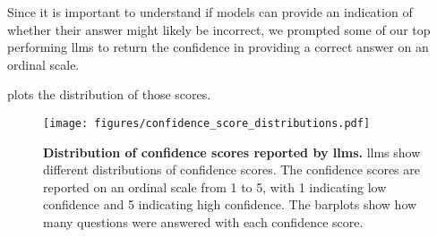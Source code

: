 Since it is important to understand if models can provide an indication of whether their answer might likely be incorrect, we prompted some of our top performing \glspl{llm} to return the confidence in providing a correct answer on an ordinal scale. 

 plots the distribution of those scores.

\begin{figure} 
    \centering
    \texttt{[image: figures/confidence\_score\_distributions.pdf]}
    \caption{\textbf{Distribution of confidence scores reported by \glspl{llm}.} \Glspl{llm} show different distributions of confidence scores. The confidence scores are reported on an ordinal scale from 1 to 5, with 1 indicating low confidence and 5 indicating high confidence. The barplots show how many questions were answered with each confidence score.}
    \label{fig:confidence_score_distributions}
\end{figure}

\printnoidxglossary[type=\acronymtype]  %
